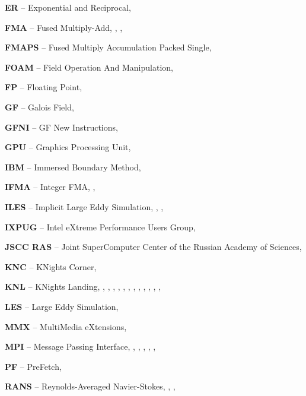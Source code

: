 \textbf{ER} -- Exponential and Reciprocal, \pageref{abbr:er-1}

\textbf{FMA} -- Fused Multiply-Add, \pageref{abbr:fma-1}, \pageref{abbr:fma-2}, \pageref{abbr:fma-3}

\textbf{FMAPS} -- Fused Multiply Accumulation Packed Single, \pageref{abbr:fmaps-1}

\textbf{FOAM} -- Field Operation And Manipulation, \pageref{abbr:foam-1}

\textbf{FP} -- Floating Point, \pageref{abbr:fp-1}

\textbf{GF} -- Galois Field, \pageref{abbr:gf-1}

\textbf{GFNI} -- GF New Instructions, \pageref{abbr:gfni-1}

\textbf{GPU} -- Graphics Processing Unit, \pageref{abbr:gpu-1}

\textbf{IBM} -- Immersed Boundary Method, \pageref{abbr:ibm-1}

\textbf{IFMA} -- Integer FMA, \pageref{abbr:ifma-1}, \pageref{abbr:ifma-2}

\textbf{ILES} -- Implicit Large Eddy Simulation, \pageref{abbr:iles-1}, \pageref{abbr:iles-2}, \pageref{abbr:iles-3}

\textbf{IXPUG} -- Intel eXtreme Performance Users Group, \pageref{abbr:ixpug-1}

\textbf{JSCC RAS} -- Joint SuperComputer Center of the Russian Academy of Sciences, \pageref{abbr:jscc-ras-1}

\textbf{KNC} -- KNights Corner, \pageref{abbr:knc-1}

\textbf{KNL} -- KNights Landing, \pageref{abbr:knl-1}, \pageref{abbr:knl-2}, \pageref{abbr:knl-3}, \pageref{abbr:knl-4}, \pageref{abbr:knl-5}, \pageref{abbr:knl-6}, \pageref{abbr:knl-7}, \pageref{abbr:knl-8}, \pageref{abbr:knl-9}, \pageref{abbr:knl-10}, \pageref{abbr:knl-10-2}, \pageref{abbr:knl-11}, \pageref{abbr:knl-12}

\textbf{LES} -- Large Eddy Simulation, \pageref{abbr:les-1}

\textbf{MMX} -- MultiMedia eXtensions, \pageref{abbr:mmx-1}

\textbf{MPI} -- Message Passing Interface, \pageref{abbr:mpi-1}, \pageref{abbr:mpi-2}, \pageref{abbr:mpi-3}, \pageref{abbr:mpi-4}, \pageref{abbr:mpi-5}, \pageref{abbr:mpi-6}

\textbf{PF} -- PreFetch, \pageref{abbr:pf-1}

\textbf{RANS} -- Reynolds-Averaged Navier-Stokes, \pageref{abbr:rans-1}, \pageref{abbr:rans-2}, \pageref{abbr:rans-3}

